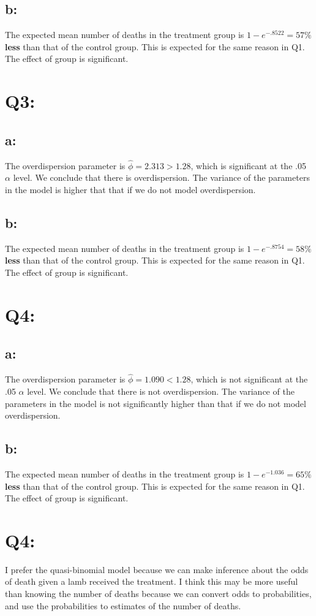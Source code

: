 \documentclass{article}
\def\beginmyfig{\begin{figure}[htbp]\begin{center}}
\def\endmyfig{\end{center}\end{figure}}
\begin{document}
\subsection*{b:}
The expected mean number of deaths in the treatment group is $1-e^{-.8522}
= 57\%$ \textbf{less} than that of the control group. This is expected for
the same reason in Q1. The effect of group is significant.

\section*{Q3:}
\subsection*{a:}
The overdispersion parameter is $\hat\phi=2.313 > 1.28$, which is
significant at the .05 $\alpha$ level. We conclude that there is
overdispersion. The variance of the parameters in the model is higher that
that if we do not model overdispersion.

\subsection*{b:}
The expected mean number of deaths in the treatment group is $1-e^{-.8754}
= 58\%$ \textbf{less} than that of the control group. This is expected for
the same reason in Q1. The effect of group is significant.

\section*{Q4:}
\subsection*{a:}
The overdispersion parameter is $\hat\phi=1.090 < 1.28$, which is not
significant at the .05 $\alpha$ level. We conclude that there is not
overdispersion. The variance of the parameters in the model is not significantly higher than that if we do not model overdispersion.

\subsection*{b:}
The expected mean number of deaths in the treatment group is $1-e^{-1.036}
= 65\%$ \textbf{less} than that of the control group. This is expected for
the same reason in Q1. The effect of group is significant.

\section*{Q4:}
I prefer the quasi-binomial model because we can make inference about the odds of death given a lamb received the treatment. I think this may be more useful than knowing the number of deaths because we can convert odds to probabilities, and use the probabilities to estimates of the number of deaths.

\end{document}
